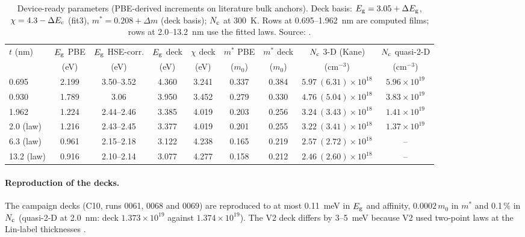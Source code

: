 \begin{table}[htbp]\centering\footnotesize
\caption{Device-ready parameters (PBE-derived increments on literature bulk anchors). Deck basis: $E_{\mathrm{g}} = 3.05 +
\Delta E_{\mathrm{g}}$, $\chi = 4.3 - \Delta E_{\mathrm{c}}$ (fit3), $m^* = 0.208 + \Delta m$ (deck basis); $N_{\mathrm{c}}$ at 300~K. Rows at 0.695--1.962~nm
are computed films; rows at 2.0--13.2~nm use the fitted laws. Source: .}
\label{tab:mono-mass-tcad}
\begin{tabular}{lcccccccc}\toprule
$t$ (nm) & $E_{\mathrm{g}}$ PBE & $E_{\mathrm{g}}$ HSE-corr. & $E_{\mathrm{g}}$ deck & $\chi$ deck & $m^*$ PBE & $m^*$ deck & $N_{\mathrm{c}}$ 3-D (Kane) & $N_{\mathrm{c}}$ quasi-2-D \\
 & (eV) & (eV) & (eV) & (eV) & ($m_0$) & ($m_0$) & (cm$^{-3}$) & (cm$^{-3}$) \\\midrule
0.695 & 2.199 & 3.50--3.52 & 4.360 & 3.241 & 0.337 & 0.384 & $5.97\ (6.31)\times10^{18}$ & $5.96\times10^{19}$ \\
0.930 & 1.789 & 3.06 & 3.950 & 3.452 & 0.279 & 0.330 & $4.76\ (5.04)\times10^{18}$ & $3.83\times10^{19}$ \\
1.962 & 1.224 & 2.44--2.46 & 3.385 & 4.019 & 0.203 & 0.256 & $3.24\ (3.43)\times10^{18}$ & $1.41\times10^{19}$ \\
2.0 (law) & 1.216 & 2.43--2.45 & 3.377 & 4.019 & 0.201 & 0.255 & $3.22\ (3.41)\times10^{18}$ & $1.37\times10^{19}$ \\
6.3 (law) & 0.961 & 2.15--2.18 & 3.122 & 4.238 & 0.165 & 0.219 & $2.57\ (2.72)\times10^{18}$ & -- \\
13.2 (law) & 0.916 & 2.10--2.14 & 3.077 & 4.277 & 0.158 & 0.212 & $2.46\ (2.60)\times10^{18}$ & -- \\\bottomrule
\end{tabular}
\end{table}

\paragraph{Reproduction of the decks.} The campaign decks (C10, runs 0061, 0068 and 0069) are reproduced to at most
0.11~meV in $E_{\mathrm{g}}$ and affinity, $0.0002\,m_0$ in $m^*$ and 0.1\,\% in $N_{\mathrm{c}}$ (quasi-2-D at 2.0~nm: deck
$1.373\times10^{19}$ against $1.374\times10^{19}$\cmcu{}). The V2 deck differs by 3--5~meV because V2 used two-point laws
at the Lin-label thicknesses .

